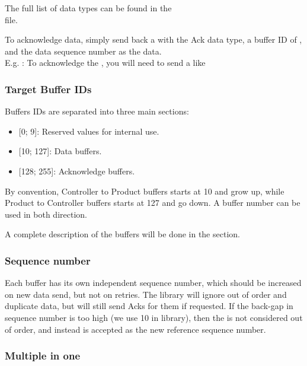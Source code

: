 The full list of data types can be found in the\\
 file.


To acknowledge data, simply send back a  with the Ack data type, a buffer ID of , and the data sequence number as the data.\\
E.g. : To acknowledge the  , you will need to send a  like 

\subsubsection{Target Buffer IDs}

Buffers IDs are separated into three main sections:
\begin{itemize}
\item{[0; 9]: Reserved values for  internal use.}
\item{[10; 127]: Data buffers.}
\item{[128; 255]: Acknowledge buffers.}
\end{itemize}

By convention, Controller to Product buffers starts at 10 and grow up, while Product to Controller buffers starts at 127 and go down. A buffer number can be used in both direction.


A complete description of the buffers will be done in the  section.

\subsubsection{Sequence number}

Each buffer has its own independent sequence number, which should be increased on new data send, but not on retries. The  library will ignore out of order and duplicate data, but will still send Acks for them if requested. If the back-gap in sequence number is too high (we use 10 in  library), then the  is not considered out of order, and instead is accepted as the new reference sequence number.

\subsubsection{Multiple  in one }

